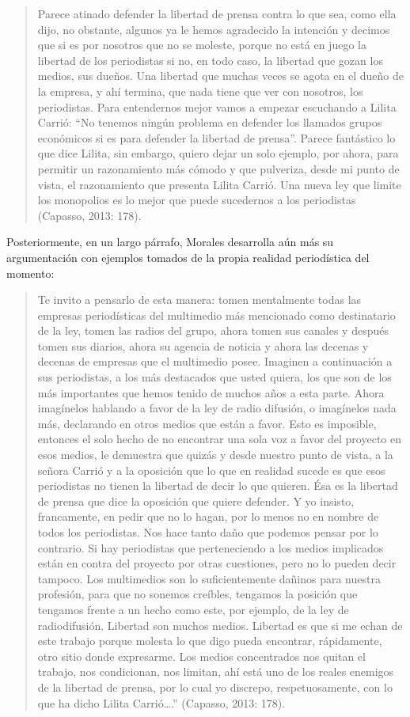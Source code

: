 \begin{quote}
Parece atinado defender la libertad de prensa contra lo que sea, como ella dijo, no obstante, algunos ya le hemos agradecido la intención y decimos que si es por nosotros que no se moleste, porque no está en juego la libertad de los periodistas si no, en todo caso, la libertad que gozan los medios, sus dueños. Una libertad que muchas veces se agota en el dueño de la empresa, y ahí termina, que nada tiene que ver con nosotros, los periodistas. Para entendernos mejor vamos a empezar escuchando a Lilita Carrió: \enquote{No tenemos ningún problema en defender los llamados grupos económicos si es para defender la libertad de prensa}. Parece fantástico lo que dice Lilita, sin embargo, quiero dejar un solo ejemplo, por ahora, para permitir un razonamiento más cómodo y que pulveriza, desde mi punto de vista, el razonamiento que presenta Lilita Carrió. Una nueva ley que limite los monopolios es lo mejor que puede sucedernos a los periodistas (Capasso, 2013: 178).
\end{quote}

Posteriormente, en un largo párrafo, Morales desarrolla aún más su argumentación con ejemplos tomados de la propia realidad periodística del momento:

\begin{quote}
Te invito a pensarlo de esta manera: tomen mentalmente todas las empresas periodísticas del multimedio más mencionado como destinatario de la ley, tomen las radios del grupo, ahora tomen sus canales y después tomen sus diarios, ahora su agencia de noticia y ahora las decenas y decenas de empresas que el multimedio posee. Imaginen a continuación a sus periodistas, a los más destacados que usted quiera, los que son de los más importantes que hemos tenido de muchos años a esta parte. Ahora imagínelos hablando a favor de la ley de radio difusión, o imagínelos nada más, declarando en otros medios que están a favor. Esto es imposible, entonces el solo hecho de no encontrar una sola voz a favor del proyecto en esos medios, le demuestra que quizás y desde nuestro punto de vista, a la señora Carrió y a la oposición que lo que en realidad sucede es que esos periodistas no tienen la libertad de decir lo que quieren. Ésa es la libertad de prensa que dice la oposición que quiere defender. Y yo insisto, francamente, en pedir que no lo hagan, por lo menos no en nombre de todos los periodistas. Nos hace tanto daño que podemos pensar por lo contrario. Si hay periodistas que perteneciendo a los medios implicados están en contra del proyecto por otras cuestiones, pero no lo pueden decir tampoco. Los multimedios son lo suficientemente dañinos para nuestra profesión, para que no sonemos creíbles, tengamos la posición que tengamos frente a un hecho como este, por ejemplo, de la ley de radiodifusión. Libertad son muchos medios. Libertad es que si me echan de este trabajo porque molesta lo que digo pueda encontrar, rápidamente, otro sitio donde expresarme. Los medios concentrados nos quitan el trabajo, nos condicionan, nos limitan, ahí está uno de los reales enemigos de la libertad de prensa, por lo cual yo discrepo, respetuosamente, con lo que ha dicho Lilita Carrió\ldots.'' (Capasso, 2013: 178).
\end{quote}

